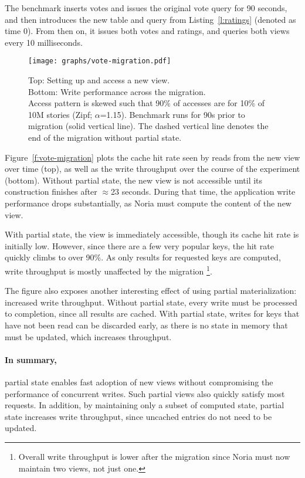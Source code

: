 The benchmark inserts votes and issues the original vote query for 90 seconds,
and then introduces the new table and query from Listing~\ref{l:ratings}
(denoted as time 0). From then on, it issues both votes and ratings, and queries
both views every 10 milliseconds.

\begin{figure}[h]
  \centering
  \texttt{[image: graphs/vote-migration.pdf]}
  \caption{Top: Setting up and access a new view.\\ Bottom: Write performance
  across the migration.\\ Access pattern is skewed such that 90\% of accesses are for
  10\% of 10M stories (Zipf; $\alpha$=1.15). Benchmark runs for 90s prior to
  migration (solid vertical line). The dashed vertical line denotes the end of
  the migration without partial state.}
  \label{f:vote-migration}
\end{figure}

Figure~\vref{f:vote-migration} plots the cache hit rate seen by reads from the
new view over time (top), as well as the write throughput over the course of the
experiment (bottom). Without partial state, the new view is not accessible until
its construction finishes after $\approx$23 seconds. During that time, the
application write performance drops substantially, as Noria must compute the
content of the new view.

With partial state, the view is immediately accessible, though its cache hit
rate is initially low. However, since there are a few very popular keys, the hit
rate quickly climbs to over 90\%. As only results for requested keys are
computed, write throughput is mostly unaffected by the migration%
\footnote{Overall write throughput is lower after the migration since Noria must
now maintain two views, not just one.}.

The figure also exposes another interesting effect of using partial
materialization: increased write throughput. Without partial state, every write
must be processed to completion, since all results are cached. With partial
state, writes for keys that have not been read can be discarded early, as there
is no state in memory that must be updated, which increases throughput.

\paragraph{In summary,} partial state enables fast adoption of new views without
compromising the performance of concurrent writes. Such partial views also
quickly satisfy most requests. In addition, by maintaining only a subset of
computed state, partial state increases write throughput, since uncached entries
do not need to be updated.

